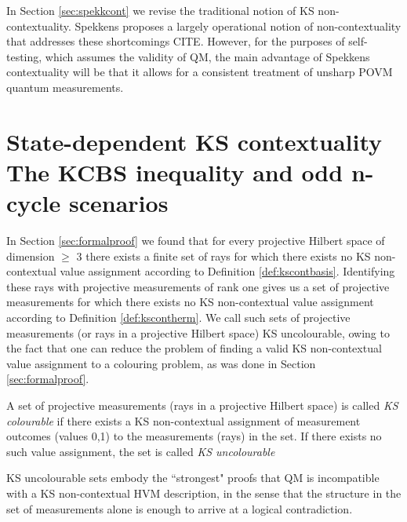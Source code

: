 In Section \ref{sec:spekkcont} we revise the traditional notion of KS non-contextuality. Spekkens proposes a largely operational notion of non-contextuality that addresses these shortcomings CITE. However, for the purposes of self-testing, which assumes the validity of QM, the main advantage of Spekkens contextuality will be that it allows for a consistent treatment of unsharp POVM quantum measurements.

\section[State-dependent KS contextuality\\ The KCBS inequality and odd n-cycle scenarios]{State-dependent KS contextuality \\ \large{The KCBS inequality and odd n-cycle scenarios}}
\label{sec:kcbs}
In Section \ref{sec:formalproof} we found that for every projective Hilbert space of dimension $\geq$ 3 there exists a finite set of rays for which there exists no KS non-contextual value assignment according to Definition \ref{def:kscontbasis}. Identifying these rays with projective measurements of rank one gives us a set of projective measurements for which there exists no KS non-contextual value assignment according to Definition \ref{def:kscontherm}. We call such sets of projective measurements (or rays in a projective Hilbert space) KS uncolourable, owing to the fact that one can reduce the problem of finding a valid KS non-contextual value assignment to a colouring problem, as was done in Section \ref{sec:formalproof}. 
\begin{definition}
A set of projective measurements (rays in a projective Hilbert space) is called \emph{KS colourable} if there exists a KS non-contextual assignment of measurement outcomes (values 0,1) to the measurements (rays) in the set. If there exists no such value assignment, the set is called \emph{KS uncolourable} 
\end{definition}
KS uncolourable sets embody the ``strongest" proofs that QM is incompatible with a KS non-contextual HVM description, in the sense that the structure in the set of measurements alone is enough to arrive at a logical contradiction.
